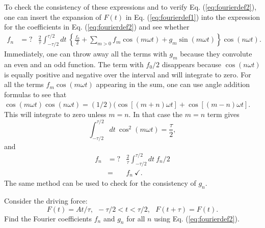 To check the consistency of these expressions and to verify Eq. (\ref{eq:fourierdef2}), one can insert the expansion of $F(t)$ in Eq. (\ref{eq:fourierdef1}) into the expression for the coefficients in Eq. (\ref{eq:fourierdef2}) and see whether
\begin{eqnarray}
f_n&=?&\frac{2}{\tau}\int_{-\tau/2}^{\tau/2} dt~\left\{
\frac{f_0}{2}+\sum_{m>0}f_m\cos(m\omega t)+g_m\sin(m\omega t)
\right\}\cos(n\omega t).
\end{eqnarray}
Immediately, one can throw away all the terms with $g_m$ because they convolute an even and an odd function. The term with $f_0/2$ disappears because $\cos(n\omega t)$ is equally positive and negative over the interval and will integrate to zero. For all the terms $f_m\cos(m\omega t)$ appearing in the sum, one can use angle addition formulas to see that $\cos(m\omega t)\cos(n\omega t)=(1/2)(\cos[(m+n)\omega t]+\cos[(m-n)\omega t]$. This will integrate to zero unless $m=n$. In that case the $m=n$ term gives
\begin{equation}
\int_{-\tau/2}^{\tau/2}dt~\cos^2(m\omega t)=\frac{\tau}{2},
\end{equation}
and
\begin{eqnarray}
f_n&=?&\frac{2}{\tau}\int_{-\tau/2}^{\tau/2} dt~f_n/2\\
\nonumber
&=&f_n~\checkmark.
\end{eqnarray}
The same method can be used to check for the consistency of $g_n$.

\example
Consider the driving force:
\begin{equation}
F(t)=At/\tau,~~-\tau/2<t<\tau/2,~~~F(t+\tau)=F(t).
\end{equation}
Find the Fourier coefficients $f_n$ and $g_n$ for all $n$ using Eq. (\ref{eq:fourierdef2}).

